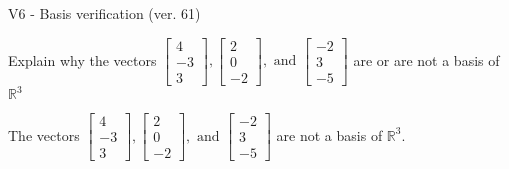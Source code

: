 \begin{exercise}
  \begin{exerciseTitle}V6 - Basis verification (ver. 61)\end{exerciseTitle}
  \begin{exerciseStatement}
    Explain why the vectors \(\left[\begin{array}{r}
4 \\
-3 \\
3
\end{array}\right] , \left[\begin{array}{r}
2 \\
0 \\
-2
\end{array}\right] , \text{ and } \left[\begin{array}{r}
-2 \\
3 \\
-5
\end{array}\right]\) are or are not a basis of \(\mathbb{R}^3\)	


  \end{exerciseStatement}
  \begin{exerciseAnswer}
   The vectors \(\left[\begin{array}{r}
4 \\
-3 \\
3
\end{array}\right] , \left[\begin{array}{r}
2 \\
0 \\
-2
\end{array}\right] , \text{ and } \left[\begin{array}{r}
-2 \\
3 \\
-5
\end{array}\right]\) 
  	 are not  a basis of \(\mathbb{R}^3\).
  


  \end{exerciseAnswer}
\end{exercise}
